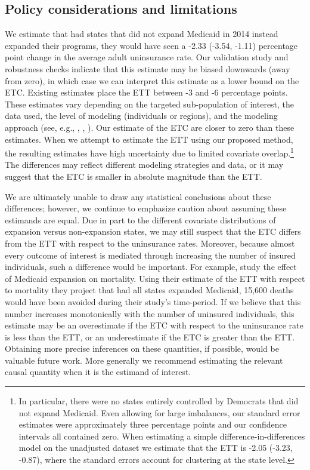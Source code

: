 \documentclass[aoas]{imsart}
\theoremstyle{plain}
\theoremstyle{remark}
\begin{document}
\subsection{Policy considerations and limitations}

We estimate that had states that did not expand Medicaid in 2014 instead expanded their programs, they would have seen a -2.33 (-3.54, -1.11) percentage point change in the average adult uninsurance rate. Our validation study and robustness checks indicate that this estimate may be biased downwards (away from zero), in which case we can interpret this estimate as a lower bound on the ETC. Existing estimates place the ETT between -3 and -6 percentage points. These estimates vary depending on the targeted sub-population of interest, the data used, the level of modeling (individuals or regions), and the modeling approach (see, e.g., \cite{courtemanche2017early}, \cite{kaestner2017effects}, \cite{frean2017premium}). Our estimate of the ETC are closer to zero than these estimates. When we attempt to estimate the ETT using our proposed method, the resulting estimates have high uncertainty due to limited covariate overlap.\footnote{In particular, there were no states entirely controlled by Democrats that did not expand Medicaid. Even allowing for large imbalances, our standard error estimates were approximately three percentage points and our confidence intervals all contained zero. When estimating a simple difference-in-differences model on the unadjusted dataset we estimate that the ETT is -2.05 (-3.23, -0.87), where the standard errors account for clustering at the state level.\label{footnote_did}} The differences may reflect different modeling strategies and data, or it may suggest that the ETC is smaller in absolute magnitude than the ETT.

We are ultimately unable to draw any statistical conclusions about these differences; however, we continue to emphasize caution about assuming these estimands are equal. Due in part to the different covariate distributions of expansion versus non-expansion states, we may still suspect that the ETC differs from the ETT with respect to the uninsurance rates. Moreover, because almost every outcome of interest is mediated through increasing the number of insured individuals, such a difference would be important. For example, \cite{miller2019medicaid} study the effect of Medicaid expansion on mortality. Using their estimate of the ETT with respect to mortality they project that had all states expanded Medicaid, 15,600 deaths would have been avoided during their study's time-period. If we believe that this number increases monotonically with the number of uninsured individuals, this estimate may be an overestimate if the ETC with respect to the uninsurance rate is less than the ETT, or an underestimate if the ETC is greater than the ETT. Obtaining more precise inferences on these quantities, if possible, would be valuable future work. More generally we recommend estimating the relevant causal quantity when it is the estimand of interest.
\end{document}
